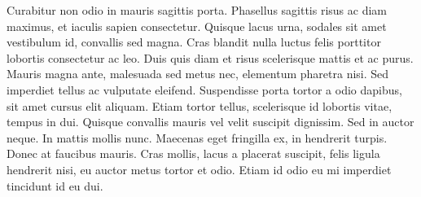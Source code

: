 \documentclass[10pt,
twocolumn,a4paper]{article}
\begin{document}
Curabitur non odio in mauris sagittis porta. Phasellus sagittis risus ac diam maximus, et iaculis sapien consectetur. Quisque lacus urna, sodales sit amet vestibulum id, convallis sed magna. Cras blandit nulla luctus felis porttitor lobortis consectetur ac leo. Duis quis diam et risus scelerisque mattis et ac purus. Mauris magna ante, malesuada sed metus nec, elementum pharetra nisi. Sed imperdiet tellus ac vulputate eleifend. Suspendisse porta tortor a odio dapibus, sit amet cursus elit aliquam. Etiam tortor tellus, scelerisque id lobortis vitae, tempus in dui. Quisque convallis mauris vel velit suscipit dignissim. Sed in auctor neque. In mattis mollis nunc. Maecenas eget fringilla ex, in hendrerit turpis. Donec at faucibus mauris. Cras mollis, lacus a placerat suscipit, felis ligula hendrerit nisi, eu auctor metus tortor et odio. Etiam id odio eu mi imperdiet tincidunt id eu dui.
\end{document}
